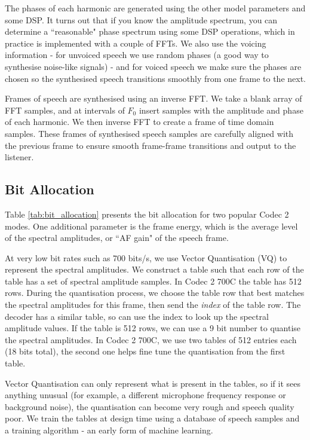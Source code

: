 \documentclass{article}
\begin{document}
{The phases of each harmonic are generated using the other model parameters and some DSP.  It turns out that if you know the amplitude spectrum, you can determine a ``reasonable" phase spectrum using some DSP operations, which in practice is implemented with a couple of FFTs.  We also use the voicing information - for unvoiced speech we use random phases (a good way to synthesise noise-like signals) - and for voiced speech we make sure the phases are chosen so the synthesised speech transitions smoothly from one frame to the next.

Frames of speech are synthesised using an inverse FFT.  We take a blank array of FFT samples, and at intervals of $F_0$ insert samples with the amplitude and phase of each harmonic.  We then inverse FFT to create a frame of time domain samples.  These frames of synthesised speech samples are carefully aligned with the previous frame to ensure smooth frame-frame transitions and output to the listener.

\subsection{Bit Allocation}

Table \ref{tab:bit_allocation} presents the bit allocation for two popular Codec 2 modes.  One additional parameter is the frame energy, which is the average level of the spectral amplitudes, or ``AF gain" of the speech frame.

At very low bit rates such as 700 bits/s, we use Vector Quantisation (VQ) to represent the spectral amplitudes.  We construct a table such that each row of the table has a set of spectral amplitude samples.  In Codec 2 700C the table has 512 rows.  During the quantisation process, we choose the table row that best matches the spectral amplitudes for this frame, then send the \emph{index} of the table row.  The decoder has a similar table, so can use the index to look up the spectral amplitude values.  If the table is 512 rows, we can use a 9 bit number to quantise the spectral amplitudes.  In Codec 2 700C, we use two tables of 512 entries each (18 bits total), the second one helps fine tune the quantisation from the first table.

Vector Quantisation can only represent what is present in the tables, so if it sees anything unusual (for example, a different microphone frequency response or background noise), the quantisation can become very rough and speech quality poor.  We train the tables at design time using a database of speech samples and a training algorithm - an early form of machine learning.

}
\end{document}
